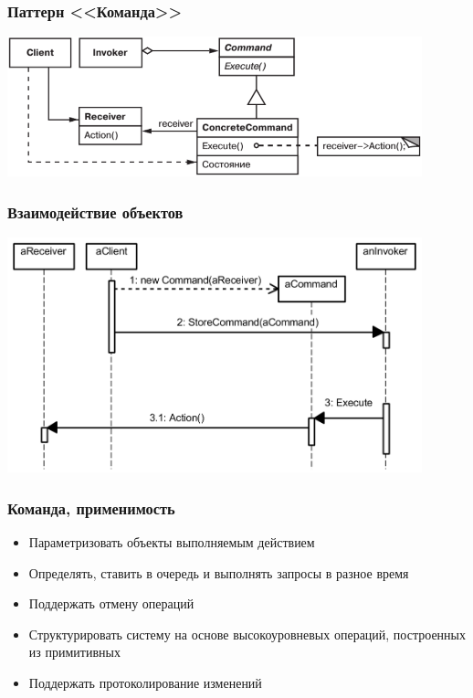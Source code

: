 \documentclass[xetex,mathserif,serif]{beamer}
\begin{document}
    \begin{frame}
        \frametitle{Паттерн <<Команда>>}
        \begin{center}
            \includegraphics[width=0.9\textwidth]{command.png}
        \end{center}
    \end{frame}

    \begin{frame}
        \frametitle{Взаимодействие объектов}
        \begin{center}
            \includegraphics[width=0.9\textwidth]{commandSequence.png}
        \end{center}
    \end{frame}

    \begin{frame}
        \frametitle{Команда, применимость}
        \begin{itemize}
            \item Параметризовать объекты выполняемым действием
            \item Определять, ставить в очередь и выполнять запросы в разное время
            \item Поддержать отмену операций
            \item Структурировать систему на основе высокоуровневых операций, построенных из примитивных
            \item Поддержать протоколирование изменений
        \end{itemize}
    \end{frame}
\end{document}
